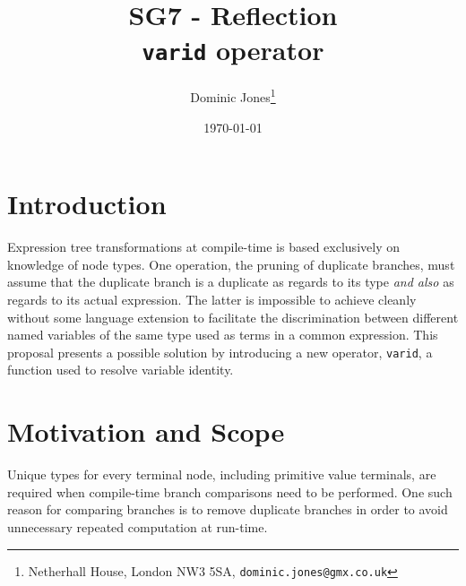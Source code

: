 \documentclass[a4paper,10pt]{article}
\title{{\CCT} SG7 - Reflection\\\texttt{varid} operator}
\author{Dominic Jones\footnote{Netherhall House, London NW3 5SA, \texttt{dominic.jones@gmx.co.uk}}}
\date{\today}
\begin{document}
\maketitle


\section{Introduction}

Expression tree transformations at compile-time is based exclusively on knowledge of node types. One operation, the pruning of duplicate branches, must assume that the duplicate branch is a duplicate as regards to its type \emph{and also} as regards to its actual expression. The latter is impossible to achieve cleanly without some language extension to facilitate the discrimination between different named variables of the same type used as terms in a common expression. This proposal presents a possible solution by introducing a new operator, \texttt{varid}, a function used to resolve variable identity.


\section{Motivation and Scope}

Unique types for every terminal node, including primitive value terminals, are required when compile-time branch comparisons need to be performed. One such reason for comparing branches is to remove duplicate branches in order to avoid unnecessary repeated computation at run-time.
\end{document}
